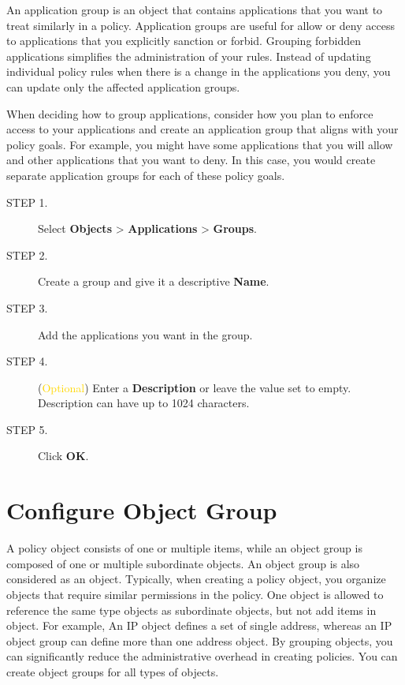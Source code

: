 An application group is an object that contains applications that you want to treat similarly in a policy. 
Application groups are useful for allow or deny access to applications that you explicitly sanction or forbid. 
Grouping forbidden applications simplifies the administration of your rules. Instead of updating individual policy rules when 
there is a change in the applications you deny, you can update only the affected application groups.


When deciding how to group applications, consider how you plan to enforce access to your applications and create an application group that aligns with your policy goals. 
For example, you might have some applications that you will allow and other applications that you want to deny. 
In this case, you would create separate application groups for each of these policy goals.

\begin{description}
    \item[STEP 1.]	Select \textbf{Objects} > \textbf{Applications} > \textbf{Groups}.
    \item[STEP 2.]	Create a group and give it a descriptive \textbf{Name}.
    \item[STEP 3.]	Add the applications you want in the group.
    \item[STEP 4.]	(\textcolor{gold}{Optional}) Enter a \textbf{Description} or leave the value set to empty. Description can have up to 1024 characters.
    \item[STEP 5.]	Click \textbf{OK}.    
\end{description}

\section*{\hypertarget{link:Configure Object Group}{Configure Object Group}}
\label{sec:objects:group}

A policy object consists of one or multiple items, while an object group is composed of one or multiple subordinate objects. 
An object group is also considered as an object. Typically, when creating a policy object, 
you organize objects that require similar permissions in the policy. One object is allowed to reference the same type objects as subordinate objects, 
but not add items in object. For example, An IP object defines a set of single address, whereas an IP object group can define more than one address object. 
By grouping objects, you can significantly reduce the administrative overhead in creating policies. You can create object groups for all types of objects.



